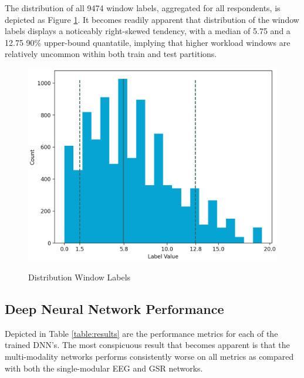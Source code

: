 \documentclass[12pt]{article}
\begin{document}
The distribution of all 9474 window labels, aggregated for all respondents,  is depicted as Figure \ref{fig:labels}. It becomes readily apparent that distribution of the window labels displays a noticeably right-skewed tendency, with a median of 5.75 and a 12.75 90\% upper-bound quantatile, implying that higher workload windows are relatively uncommon within both train and test partitions.  
\vspace{0.1cm}

\begin{figure}[h]
\caption{Distribution Window Labels}
\includegraphics[scale=0.39]{labels.png}
\label{fig:labels}
\end{figure}

\subsection{Deep Neural Network Performance}
Depicted in Table \ref{table:results} are the performance metrics for each of the trained DNN's. The most conspicuous result that becomes apparent is that the multi-modality networks performs consistently worse on all metrics as compared with both the single-modular EEG and GSR networks.
\end{document}
